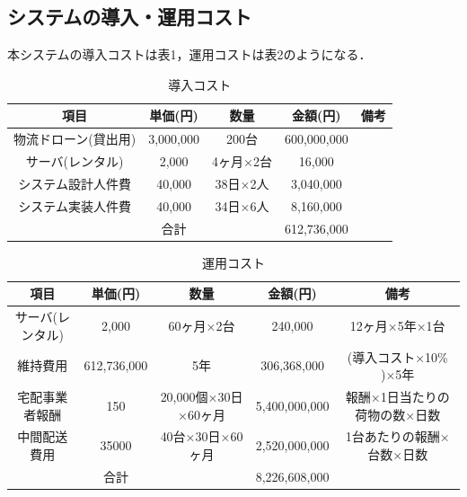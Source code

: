 \documentclass[a4paper, titlepage]{jsarticle}
\begin{document}
\subsection{システムの導入・運用コスト}
本システムの導入コストは表1，運用コストは表2のようになる．
\begin{table}[htbp]
        \centering
        \begin{tabular}{c c c c c}
                \hline
                項目          & 単価(円)     & 数量     & 金額(円)       & 備考 \\
                \hline \hline
                物流ドローン(貸出用) & 3,000,000 & 200台   & 600,000,000 &    \\
                サーバ(レンタル)   & 2,000     & 4ヶ月×2台 & 16,000      &    \\
                システム設計人件費   & 40,000    & 38日×2人 & 3,040,000   &    \\
                システム実装人件費   & 40,000    & 34日×6人 & 8,160,000   &    \\
                \hline \hline
                            & 合計        &        & 612,736,000 &    \\
                \hline
        \end{tabular}
        \caption{導入コスト}
        \label{tab:label1}
\end{table}

\begin{table}[htbp]
        \centering
        \begin{tabular}{c c c c c}
                \hline
                項目        & 単価(円)       & 数量               & 金額(円)         & 備考               \\
                \hline \hline
                サーバ(レンタル) & 2,000       & 60ヶ月×2台          & 240,000       & 12ヶ月×5年×1台       \\
                維持費用      & 612,736,000 & 5年               & 306,368,000   & (導入コスト×10\% )×5年 \\
                宅配事業者報酬   & 150         & 20,000個×30日×60ヶ月 & 5,400,000,000 & 報酬×1日当たりの荷物の数×日数 \\
                中間配送費用    & 35000       & 40台×30日×60ヶ月     & 2,520,000,000 & 1台あたりの報酬×台数×日数   \\
                \hline \hline
                          & 合計          &                  & 8,226,608,000 &                  \\
                \hline
        \end{tabular}
        \caption{運用コスト}
        \label{tab:label2}
\end{table}
\end{document}
